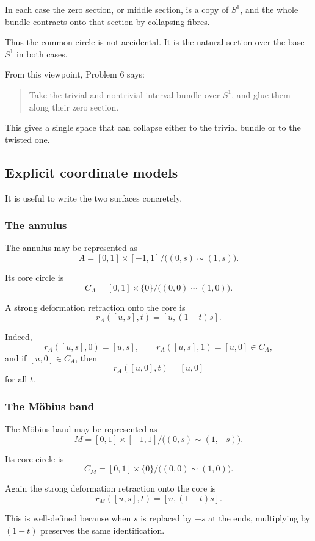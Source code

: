 \documentclass[12pt,a4paper]{article}
\theoremstyle{notespace}
\begin{document}
In each case the zero section, or middle section, is a copy of \(S^1\), and the whole bundle contracts onto that section by collapsing fibres.

Thus the common circle is not accidental. It is the natural section over the base \(S^1\) in both cases.

From this viewpoint, Problem 6 says:

\begin{quote}
	Take the trivial and nontrivial interval bundle over \(S^1\), and glue them along their zero section.
\end{quote}

This gives a single space that can collapse either to the trivial bundle or to the twisted one.

\subsection{Explicit coordinate models}

It is useful to write the two surfaces concretely.

\subsubsection{The annulus}

The annulus may be represented as
\[
A=[0,1]\times [-1,1]\big/\bigl((0,s)\sim (1,s)\bigr).
\]

Its core circle is
\[
C_A=[0,1]\times \{0\}\big/\bigl((0,0)\sim (1,0)\bigr).
\]

A strong deformation retraction onto the core is
\[
r_A([u,s],t)=[u,(1-t)s].
\]

Indeed,
\[
r_A([u,s],0)=[u,s],
\qquad
r_A([u,s],1)=[u,0]\in C_A,
\]
and if \([u,0]\in C_A\), then
\[
r_A([u,0],t)=[u,0]
\]
for all \(t\).

\subsubsection{The Möbius band}

The Möbius band may be represented as
\[
M=[0,1]\times [-1,1]\big/\bigl((0,s)\sim (1,-s)\bigr).
\]

Its core circle is
\[
C_M=[0,1]\times \{0\}\big/\bigl((0,0)\sim (1,0)\bigr).
\]

Again the strong deformation retraction onto the core is
\[
r_M([u,s],t)=[u,(1-t)s].
\]

This is well-defined because when \(s\) is replaced by \(-s\) at the ends, multiplying by \((1-t)\) preserves the same identification.
\end{document}
